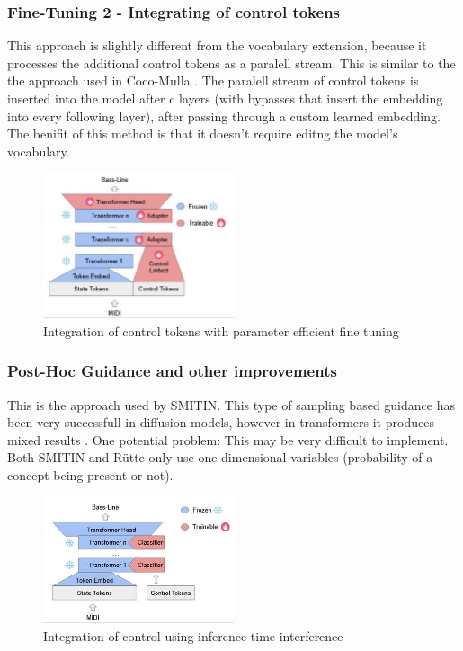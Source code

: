 \subsubsection{Fine-Tuning 2 - Integrating of control tokens} 

This approach is slightly different from the vocabulary extension, because it processes the additional control tokens as a paralell stream. This is similar to the the approach used in Coco-Mulla \cite{Lin_cocomulla_2024}. The paralell stream of control tokens is inserted into the model after c layers (with bypasses that insert the embedding into every following layer), after passing through a custom learned embedding. The benifit of this method is that it doesn't require editng the model's vocabulary. 
 
\begin{figure}[H]
    \centering
    \includegraphics[width=0.5\textwidth]{IMAGES/ControlTokensLora.jpg} 
    \caption{Integration of control tokens with parameter efficient fine tuning}
    \label{fig:controltok}
\end{figure}

\subsubsection{Post-Hoc Guidance and other improvements}

This is the approach used by SMITIN\cite{Koo_Wichern_Germain_SMITIN_2024}. This type of sampling based guidance has been very successfull in diffusion models, however in transformers it produces mixed results \cite{language_guide_rutte_2024}.  One potential problem: This may be very difficult to implement. Both SMITIN and Rütte\cite{language_guide_rutte_2024} only use one dimensional variables (probability of a concept being present or not).

\begin{figure}[H]
    \centering
    \includegraphics[width=0.5\textwidth]{IMAGES/adhoccontrol.jpg} 
    \caption{Integration of control using inference time interference}
    \label{fig:adhoccontrol}
\end{figure}

